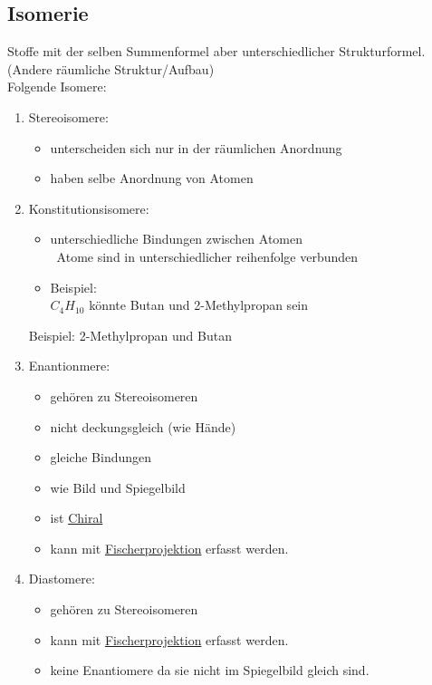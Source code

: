 \subsection{Isomerie}
\label{sec:isomere}
Stoffe mit der selben Summenformel aber unterschiedlicher Strukturformel. \\
(Andere räumliche Struktur/Aufbau) \\
Folgende Isomere: 
\begin{enumerate}
    \item Stereoisomere:
        \begin{itemize}
            \item unterscheiden sich nur in der räumlichen Anordnung
            \item haben selbe Anordnung von Atomen
        \end{itemize}
    \item Konstitutionsisomere:
        \begin{itemize}
            \item unterschiedliche Bindungen zwischen Atomen \\
                \textrightarrow\ Atome sind in unterschiedlicher reihenfolge verbunden
            \item Beispiel: \\
                $C_4H_10$ könnte Butan und 2-Methylpropan sein
        \end{itemize}
        Beispiel: 2-Methylpropan und Butan
    \item Enantionmere:
        \begin{itemize}
            \item gehören zu Stereoisomeren
            \item nicht deckungsgleich (wie Hände)
            \item gleiche Bindungen
            \item wie Bild und Spiegelbild
            \item ist \hyperref[sec:chiral]{Chiral}
            \item kann mit \hyperref[sec:fischer]{Fischerprojektion} erfasst werden.
        \end{itemize}
    \item Diastomere:
        \begin{itemize}
            \item gehören zu Stereoisomeren
            \item kann mit \hyperref[sec:fischer]{Fischerprojektion} erfasst werden.
            \item keine Enantiomere da sie nicht im Spiegelbild gleich sind.
        \end{itemize}
\end{enumerate}

